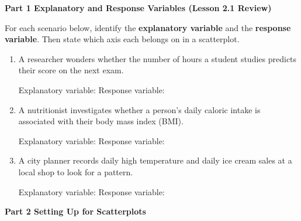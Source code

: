 \documentclass[10pt]{article}
\begin{document}
\namedateperiod

\vspace{0.3in}

{\large\bfseries\color{navy} Part 1 \quad Explanatory and Response Variables (Lesson 2.1 Review)}

\vspace{0.12in}

\noindent For each scenario below, identify the \textbf{explanatory variable} and the
\textbf{response variable}. Then state which axis each belongs on in a scatterplot.

\vspace{0.1in}

\begin{enumerate}[leftmargin=1.6em, itemsep=0.22in]

  \item A researcher wonders whether the number of hours a student studies predicts their
        score on the next exam.

        \vspace{8pt}
        Explanatory variable:  \quad Response variable: 

  \item A nutritionist investigates whether a person's daily caloric intake is associated
        with their body mass index (BMI).

        \vspace{8pt}
        Explanatory variable:  \quad Response variable: 

  \item A city planner records daily high temperature and daily ice cream sales at a local
        shop to look for a pattern.

        \vspace{8pt}
        Explanatory variable:  \quad Response variable: 

\end{enumerate}

\vspace{0.28in}

{\large\bfseries\color{navy} Part 2 \quad Setting Up for Scatterplots}

\vspace{0.12in}
\end{document}
